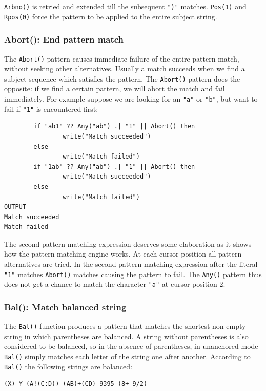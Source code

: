 \documentclass[letterpaper,12pt]{article}
\begin{document}
\texttt{Arbno()} is retried and extended till the subsequent \texttt{")"}
matches. {\tt Pos(1)} and {\tt Rpos(0)} force the pattern to be applied to the
entire subject string.

\subsubsection{Abort(): End pattern match}

The {\tt Abort()} pattern causes immediate failure of the entire pattern
match, without seeking other alternatives. Usually a match succeeds
when we find a subject sequence which satisfies the pattern. The
{\tt Abort()} pattern does the opposite: if we find a certain pattern, we
will abort the match and fail immediately.  For example suppose we are
looking for an \texttt{"a"} or \texttt{"b"}, but want to fail if
\texttt{"1"} is encountered first:

\begin{verbatim}
        if "ab1" ?? Any("ab") .| "1" || Abort() then
                write("Match succeeded")
        else
                write("Match failed")
        if "1ab" ?? Any("ab") .| "1" || Abort() then
                write("Match succeeded")
        else
                write("Match failed")
OUTPUT
Match succeeded
Match failed
\end{verbatim}

The second pattern matching expression deserves some elaboration as it
shows how the pattern matching engine works. At each cursor position
all pattern alternatives are tried. In the second pattern matching
expression after the literal {\tt "1"} matches {\tt Abort()} matches causing
the pattern to fail.  The {\tt Any()} pattern thus does not get a chance to
match the character {\tt "a"} at cursor position 2.

\subsubsection{Bal(): Match balanced string }

The {\tt Bal()} function produces a pattern that matches the shortest
non-empty string in which parentheses are balanced. A string without
parentheses is also considered to be balanced, so in the absence of
parentheses, in unanchored mode {\tt Bal()} simply matches each letter
of the string one after another. According to {\tt Bal()}
the following strings are balanced:

\begin{verbatim}
(X) Y (A!(C:D)) (AB)+(CD) 9395 (8+-9/2)
\end{verbatim}
\end{document}

